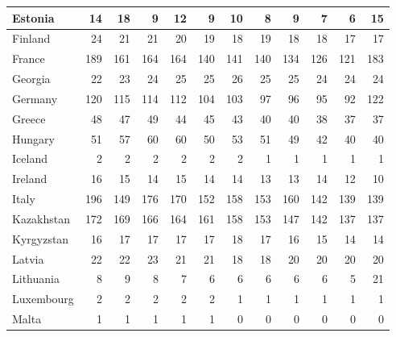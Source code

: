 \begin{table}
\begin{tabular}{|l|r|r|r|r|r|r|r|r|r|r|r|}
                       Estonia&     14&     18&      9&     12&      9&     10&      8&      9&      7&      6&     15\\\hline
                       Finland&     24&     21&     21&     20&     19&     18&     19&     18&     18&     17&     17\\\hline
                        France&    189&    161&    164&    164&    140&    141&    140&    134&    126&    121&    183\\\hline
                       Georgia&     22&     23&     24&     25&     25&     26&     25&     25&     24&     24&     24\\\hline
                       Germany&    120&    115&    114&    112&    104&    103&     97&     96&     95&     92&    122\\\hline
                        Greece&     48&     47&     49&     44&     45&     43&     40&     40&     38&     37&     37\\\hline
                       Hungary&     51&     57&     60&     60&     50&     53&     51&     49&     42&     40&     40\\\hline
                       Iceland&      2&      2&      2&      2&      2&      2&      1&      1&      1&      1&      1\\\hline
                       Ireland&     16&     15&     14&     15&     14&     14&     13&     13&     14&     12&     10\\\hline
                         Italy&    196&    149&    176&    170&    152&    158&    153&    160&    142&    139&    139\\\hline
                    Kazakhstan&    172&    169&    166&    164&    161&    158&    153&    147&    142&    137&    137\\\hline
                    Kyrgyzstan&     16&     17&     17&     17&     17&     18&     17&     16&     15&     14&     14\\\hline
                        Latvia&     22&     22&     23&     21&     21&     18&     18&     20&     20&     20&     20\\\hline
                     Lithuania&      8&      9&      8&      7&      6&      6&      6&      6&      6&      5&     21\\\hline
                    Luxembourg&      2&      2&      2&      2&      2&      1&      1&      1&      1&      1&      1\\\hline
                         Malta&      1&      1&      1&      1&      1&      0&      0&      0&      0&      0&      0\\\hline

\end{tabular}
\end{table}
